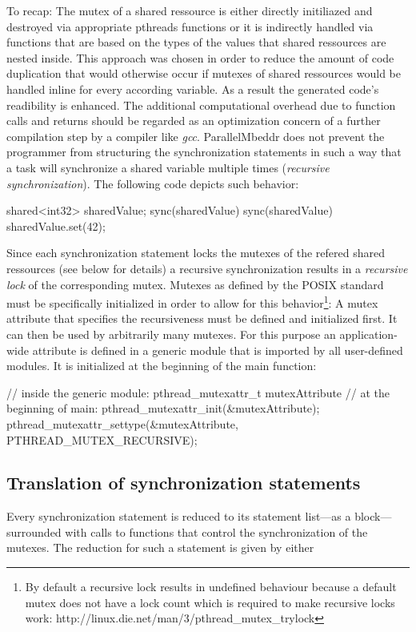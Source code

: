 To recap: The mutex of a shared ressource is either directly initiliazed and destroyed via appropriate pthreads functions or it is indirectly handled via functions that are based on the types of the values that shared ressources are nested inside. This approach was chosen in order to reduce the amount of code duplication that would otherwise occur if mutexes of shared ressources would be handled inline for every according variable. As a result the generated code's readibility is enhanced. The additional computational overhead due to function calls and returns should be regarded as an optimization concern of a further compilation step by a compiler like \textit{gcc}.
ParallelMbeddr does not prevent the programmer from structuring the synchronization statements in such a way that a task will synchronize a shared variable multiple times (\textit{recursive synchronization}). The following code depicts such behavior:
\begin{ccode}
shared<int32> sharedValue;
sync(sharedValue) {
  sync(sharedValue) {
    sharedValue.set(42);
  }
}
\end{ccode}
Since each synchronization statement locks the mutexes of the refered shared ressources (see below for details) a recursive synchronization results in a \textit{recursive lock} of the corresponding mutex. Mutexes as defined by the POSIX standard must be specifically initialized in order to allow for this behavior\footnote{By default a recursive lock results in undefined behaviour because a default mutex does not have a lock count which is required to make recursive locks work: http://linux.die.net/man/3/pthread\_mutex\_trylock}: A mutex attribute that specifies the recursiveness must be defined and initialized first. It can then be used by arbitrarily many mutexes. 
For this purpose an application-wide attribute is defined in a generic module that is imported by all user-defined modules. It is initialized at the beginning of the main function:
\begin{ccode}
// inside the generic module:
pthread_mutexattr_t mutexAttribute
// at the beginning of main:
pthread_mutexattr_init(&mutexAttribute);
pthread_mutexattr_settype(&mutexAttribute, PTHREAD_MUTEX_RECURSIVE);
\end{ccode}

\subsection{Translation of synchronization statements}
Every synchronization statement is reduced to its statement list---as a block---surrounded with calls to functions that control the synchronization of the mutexes. The reduction for such a statement is given by either

